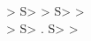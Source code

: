 \documentclass{article}
\begin{document}
\begin{beltgrid}[expect=full-load]
> S> > S> > \\
> S> . S> >
\end{beltgrid}
\end{document}
